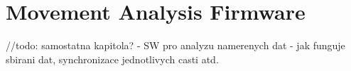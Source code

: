 \section{Movement Analysis Firmware}
\label{HorseFirmware}


//todo: samostatna kapitola?
- SW pro analyzu namerenych dat
- jak funguje sbirani dat, synchronizace jednotlivych casti atd.
